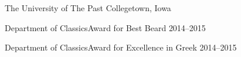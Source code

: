 

\headedsection %
{The University of The Past}
{Collegetown, Iowa} {

\headedsubsection %
{\textnormal{Department of Classics}\bull Award
for Best Beard}
{2014--2015}{}

\headedsubsection %
{\textnormal{Department of Classics}\bull Award
for Excellence in Greek}
{2014--2015}{}

}


\spacedhrule{0.5em}{-0.4em} %
